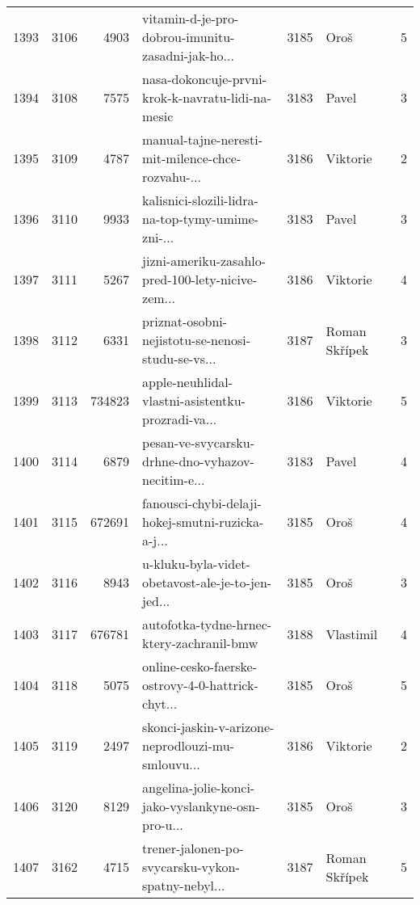 \begin{tabular}{lrrlrlr}
1393 &       3106 &     4903 &  vitamin-d-je-pro-dobrou-imunitu-zasadni-jak-ho... &     3185 &                         Oroš &               5 \\
1394 &       3108 &     7575 &  nasa-dokoncuje-prvni-krok-k-navratu-lidi-na-mesic &     3183 &                        Pavel &               3 \\
1395 &       3109 &     4787 &  manual-tajne-neresti-mit-milence-chce-rozvahu-... &     3186 &                     Viktorie &               2 \\
1396 &       3110 &     9933 &  kalisnici-slozili-lidra-na-top-tymy-umime-zni-... &     3183 &                        Pavel &               3 \\
1397 &       3111 &     5267 &  jizni-ameriku-zasahlo-pred-100-lety-nicive-zem... &     3186 &                     Viktorie &               4 \\
1398 &       3112 &     6331 &  priznat-osobni-nejistotu-se-nenosi-studu-se-vs... &     3187 &                Roman Skřípek &               3 \\
1399 &       3113 &   734823 &  apple-neuhlidal-vlastni-asistentku-prozradi-va... &     3186 &                     Viktorie &               5 \\
1400 &       3114 &     6879 &  pesan-ve-svycarsku-drhne-dno-vyhazov-necitim-e... &     3183 &                        Pavel &               4 \\
1401 &       3115 &   672691 &  fanousci-chybi-delaji-hokej-smutni-ruzicka-a-j... &     3185 &                         Oroš &               4 \\
1402 &       3116 &     8943 &  u-kluku-byla-videt-obetavost-ale-je-to-jen-jed... &     3185 &                         Oroš &               3 \\
1403 &       3117 &   676781 &          autofotka-tydne-hrnec-ktery-zachranil-bmw &     3188 &                    Vlastimil &               4 \\
1404 &       3118 &     5075 &  online-cesko-faerske-ostrovy-4-0-hattrick-chyt... &     3185 &                         Oroš &               5 \\
1405 &       3119 &     2497 &  skonci-jaskin-v-arizone-neprodlouzi-mu-smlouvu... &     3186 &                     Viktorie &               2 \\
1406 &       3120 &     8129 &  angelina-jolie-konci-jako-vyslankyne-osn-pro-u... &     3185 &                         Oroš &               3 \\
1407 &       3162 &     4715 &  trener-jalonen-po-svycarsku-vykon-spatny-nebyl... &     3187 &                Roman Skřípek &               5 \\

\end{tabular}
